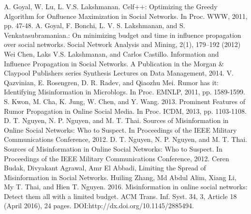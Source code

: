 \begin{thebibliography}{4}
	 A. Goyal, W. Lu, L. V.S. Lakshmanan. Celf++: Optimizing the Greedy Algorithm for Onfluence Maximization in Social Networks. In Proc. WWW, 2011, pp. 47-48.
	 A. Goyal, F. Bonchi, L. V. S. Lakshmanan, and S. Venkatasubramanian.: On minimizing budget and time in influence propagation over social networks. Social Network Analysis and Mining, 2(1), 179--192 (2012)
	 Wei Chen, Laks V.S. Lakshmanan, and Carlos Castillo. Information and Influence Propagation in Social Networks. A Publication in the Morgan \& Claypool Publishers series Synthesis Lectures on Data Management, 2014.
	 V. Qazvinian, E. Rosengren, D. R. Radev, and Qiaozhu Mei. Rumor has it: Identifying Misinformation in Microblogs. In Proc. EMNLP, 2011, pp. 1589-1599.
	 S. Kwon, M. Cha, K. Jung, W. Chen, and Y. Wang. 2013. Prominent Features of Rumor Propagation in Online Social Media. In Proc. ICDM, 2013, pp. 1103-1108.
	 D. T. Nguyen, N. P. Nguyen, and M. T. Thai. Sources of Misinformation in Online Social Networks: Who to Suspect. In Proceedings of the IEEE Military Communications Conference, 2012.
	 D. T. Nguyen, N. P. Nguyen, and M. T. Thai. Sources of Misinformation in Online Social Networks: Who to Suspect. In Proceedings of the IEEE Military Communications Conference, 2012.
	 Ceren Budak, Divyakant Agrawal, Amr El Abbadi, Limiting the Spread of Misinformation in Social Networks.
	 Huiling Zhang, Md Abdul Alim, Xiang Li, My T. Thai, and Hien T. Nguyen. 2016. Misinformation in online social networks: Detect them all with a limited budget. ACM Trans. Inf. Syst. 34, 3, Article 18 (April 2016), 24 pages. DOI:http://dx.doi.org/10.1145/2885494.
	

\end{thebibliography}
